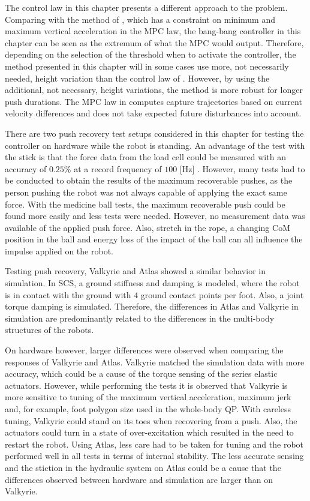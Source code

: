 The control law in this chapter presents a different approach to the problem. Comparing with the method of \cite{caron2018balance}, which has a constraint on minimum and maximum vertical acceleration in the \ac{MPC} law, the bang-bang controller in this chapter can be seen as the extremum of what the \ac{MPC} would output. Therefore, depending on the selection of the threshold when to activate the controller, the method presented in this chapter will in some cases use more, not necessarily needed, height variation than the control law of \cite{caron2018balance}. However, by using the additional, not necessary, height variations, the method is more robust for longer push durations. The \ac{MPC} law in \cite{caron2018balance} computes capture trajectories based on current velocity differences and does not take expected future disturbances into account.

There are two push recovery test setups considered in this chapter for testing the controller on hardware while the robot is standing. An advantage of the test with the stick is that the force data from the load cell could be measured with an accuracy of $0.25$\% at a record frequency of $100$ [Hz] \cite{iload}. However, many tests had to be conducted to obtain the results of the maximum recoverable pushes, as the person pushing the robot was not always capable of applying the exact same force. With the medicine ball tests, the maximum recoverable push could be found more easily and less tests were needed. However, no measurement data was available of the applied push force. Also, stretch in the rope, a changing \ac{CoM} position in the ball and energy loss of the impact of the ball can all influence the impulse applied on the robot.

Testing push recovery, Valkyrie and Atlas showed a similar behavior in simulation. In \ac{SCS}, a ground stiffness and damping is modeled, where the robot is in contact with the ground with $4$ ground contact points per foot. Also, a joint torque damping is simulated. Therefore, the differences in Atlas and Valkyrie in simulation are predominantly related to the differences in the multi-body structures of the robots.

On hardware however, larger differences were observed when comparing the responses of Valkyrie and Atlas. Valkyrie matched the simulation data with more accuracy, which could be a cause of the torque sensing of the series elastic actuators. However, while performing the tests it is observed that Valkyrie is more sensitive to tuning of the maximum vertical acceleration, maximum jerk and, for example, foot polygon size used in the whole-body \ac{QP}. With careless tuning, Valkyrie could stand on its toes when recovering from a push. Also, the actuators could turn in a state of over-excitation which resulted in the need to restart the robot. Using Atlas, less care had to be taken for tuning and the robot performed well in all tests in terms of internal stability. The less accurate sensing and the stiction in the hydraulic system on Atlas could be a cause that the differences observed between hardware and simulation are larger than on Valkyrie.

